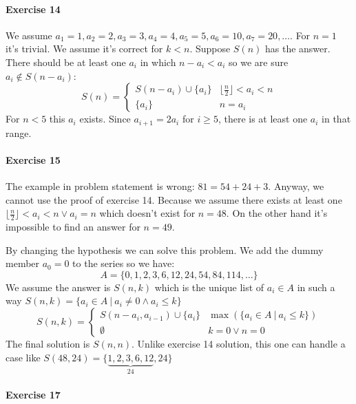 \documentclass{book}
\begin{document}
	\paragraph{Exercise 14}
	We assume $a_1 = 1, a_2 = 2, a_3 = 3, a_4 = 4, a_5=5, a_6 = 10, a_7 = 20, \dots$. For $n = 1$ it's trivial. We assume it's correct for $k < n$. Suppose $S(n)$ has the answer. There should be at least one $a_i$ in which $n - a_i < a_i$ so we are sure $a_i \notin S(n - a_i)$: 
	\begin{equation*}
		S(n) = \begin{cases}
			S(n - a_i) \cup \{a_i\} & \lfloor \frac{n}{2} \rfloor < a_i < n \\
			\{a_i\} & n = a_i
		\end{cases}
	\end{equation*}
	For $n < 5$ this $a_i$ exists. Since $a_{i + 1} = 2a_i$ for $i \ge 5$, there is at least one $a_i$ in that range.
	
	\paragraph{Exercise 15}
	The example in problem statement is wrong: $81 = 54 + 24 + 3$. Anyway, we cannot use the proof of exercise 14. Because we assume there exists at least one $\lfloor \frac{n}{2} \rfloor < a_i < n \lor a_i = n$ which doesn't exist for $n=48$. On the other hand it's impossible to find an answer for $n=49$.
	\par By changing the hypothesis we can solve this problem. We add the dummy member $a_0 = 0$ to the series so we have:
	\begin{equation*}
		A = \{0, 1, 2, 3, 6, 12, 24, 54, 84, 114, \dots\}
	\end{equation*}
	We assume the answer is $S(n, k)$ which is the unique list of $a_i \in A$ in such a way $S(n, k) = \{a_i \in A\ |\ a_i \ne 0 \land a_i \le k\}$
	\begin{equation*}
		S(n, k) = \begin{cases}
			S(n - a_i, a_{i - 1}) \cup \{a_i\} & \max(\{a_i \in A\ |\ a_i \le k\}) \\
			\emptyset & k = 0 \lor n = 0
		\end{cases}
	\end{equation*}
	The final solution is $S(n, n)$. Unlike exercise 14 solution, this one can handle a case like $S(48, 24) = \{\underbrace{1, 2, 3, 6, 12}_{24}, 24\}$
	
	\paragraph{Exercise 17}
	
\end{document}
